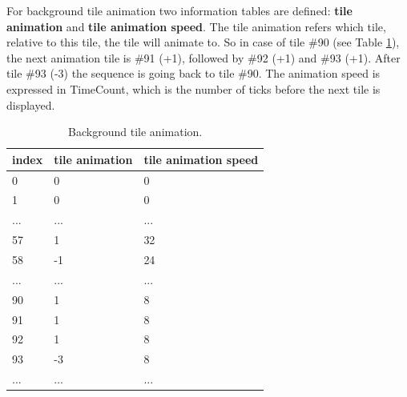 \documentclass[book.tex]{subfiles}
\begin{document}
For background tile animation two information tables are defined: \textbf{tile animation} and \textbf{tile animation speed}. The tile animation refers which tile, relative to this tile, the tile will animate to. So in case of tile \#90 (see Table \ref{table:background tile anim}), the next animation tile is \#91 (+1), followed by \#92 (+1) and \#93 (+1). After tile \#93 (-3) the sequence is going back to tile \#90. The animation speed is expressed in TimeCount, which is the number of ticks before the next tile is displayed. \\
 \begin{table}[H]
  \begin{tabularx}{\textwidth}[c]{XXX}
  \hline
  \textbf{index} & \textbf{tile animation} & \textbf{tile animation speed}   \\ \hline
  0             & 0          & 0    \\
  1             & 0          & 0    \\
  ...             & ...          & ...    \\
  57             & 1          & 32    \\
  58             & -1          & 24    \\
  ...             & ...          & ...    \\
  90             & 1          & 8    \\
  91            & 1          & 8    \\
  92             & 1          & 8    \\
  93             & -3          & 8    \\
  ...             & ...          & ...    \\
  \end{tabularx}
  \caption{Background tile animation.}
  \label{table:background tile anim}
  \end{table}
  
\end{document}
